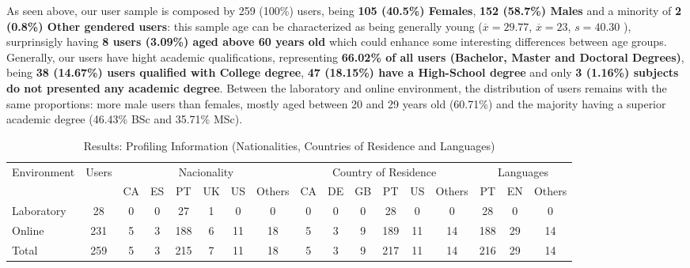 %
As seen above, our user sample is composed by 259 (100\%) users, being \textbf{105 (40.5\%) Females}, \textbf{152 (58.7\%) Males} and a minority of \textbf{2 (0.8\%) Other gendered users}: this sample age can
be characterized as being generally young ($\overline{x} = 29.77$, $\overline{x} = 23$, $s = 40.30$ ), surprinsigly having \textbf{8 users (3.09\%) aged above 60 years old} which could enhance some interesting
differences between age groups. Generally, our users have hight academic qualifications, representing \textbf{66.02\% of all users (Bachelor, Master and Doctoral Degrees)}, being \textbf{38 (14.67\%) users
qualified with College degree}, \textbf{47 (18.15\%) have a High-School degree} and only \textbf{3 (1.16\%) subjects do not presented any academic degree}. Between the laboratory and online environment, the distribution
of users remains with the same proportions: more male users than females, mostly aged between 20 and 29 years old (60.71\%) and the majority having a superior academic degree (46.43\% BSc and 35.71\% MSc). \par
%
\begin{table}[htbp]
  \resizebox{\textwidth}{!} {
  \begin{tabular}{| l || c || c | c | c | c | c | c || c | c | c | c | c | c || c | c | c |}
    \hline
    \multicolumn{1}{|c||}{\multirow{2}{*}{Environment}} & \multirow{2}{*}{Users} & \multicolumn{6}{c||}{Nacionality} & \multicolumn{6}{c||}{Country of Residence} & \multicolumn{3}{c|}{Languages} \\ \cline{3-17}
    \multicolumn{1}{|c||}{}                             &                        & CA  & ES & PT & UK & US & Others & CA   & DE   & GB   & PT   & US  & Others  & PT      & EN      & Others     \\ \hline
    Laboratory                                         & 28                     & 0   & 0  & 27 & 1  & 0  & 0      & 0    & 0    & 0    & 28   & 0   & 0       & 28      & 0       & 0          \\ \hline
    Online                                             & 231                    & 5   & 3  & 188& 6  & 11 & 18     & 5    & 3    & 9    & 189  & 11  & 14      & 188     & 29      & 14         \\ \hline \hline
    Total                                              & 259                    & 5   & 3  & 215& 7  & 11 & 18     & 5    & 3    & 9    & 217  & 11  & 14      & 216     & 29      & 14         \\ \hline
  \end{tabular}}
  \caption[Results: Profiling Information (Nationalities, Countries of Residence and Languages)]{Results: Profiling Information (Nationalities, Countries of Residence and Languages)}
  \label{table:profiling_nacionalities}
\end{table}
